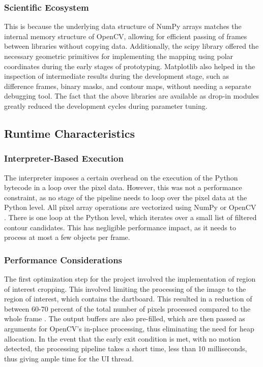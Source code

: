 \subsubsection{Scientific Ecosystem}
This is because the underlying data structure of NumPy arrays matches the internal memory structure of OpenCV, allowing for efficient passing of frames between libraries without copying data. Additionally, the scipy library offered the necessary geometric primitives for implementing the mapping using polar coordinates during the early stages of prototyping. Matplotlib also helped in the inspection of intermediate results during the development stage, such as difference frames, binary masks, and contour maps, without needing a separate debugging tool. The fact that the above libraries are available as drop-in modules greatly reduced the development cycles during parameter tuning.

\subsection{Runtime Characteristics}

\subsubsection{Interpreter-Based Execution}
The interpreter imposes a certain overhead on the execution of the Python bytecode in a loop over the pixel data. However, this was not a performance constraint, as no stage of the pipeline needs to loop over the pixel data at the Python level. All pixel array operations are vectorized using NumPy or OpenCV \cite{Harris2020}. There is one loop at the Python level, which iterates over a small list of filtered contour candidates. This has negligible performance impact, as it needs to process at most a few objects per frame.


\subsubsection{Performance Considerations}
The first optimization step for the project involved the implementation of region of interest cropping. This involved limiting the processing of the image to the region of interest, which contains the dartboard. This resulted in a reduction of between 60-70 percent of the total number of pixels processed compared to the whole frame \cite{Viola2001}. The output buffers are also pre-filled, which are then passed as arguments for OpenCV's in-place processing, thus eliminating the need for heap allocation. In the event that the early exit condition is met, with no motion detected, the processing pipeline takes a short time, less than 10 milliseconds, thus giving ample time for the UI thread.

